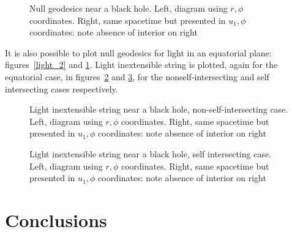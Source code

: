 \documentclass{article}
\begin{document}
\begin{figure}%
    \centering
    \caption{Null geodesics near a black hole.  Left, diagram using $r,\phi$
      coordinates.  Right, same spacetime but presented in $u_1,\phi$
      coordinates: note absence of interior on right}
    \label{light_closest_2}%
\end{figure}

It is also possible to plot null geodesics for light in an equatorial
plane: figures~\ref{light_2} and \ref{light_closest_2}.  Light
inextensible string is plotted, again for the equatorial case, in
figures~\ref{closest_approach_nonself} and
\ref{closest_approach_self}, for the nonself-intersecting and self
intersecting cases respectively.


\begin{figure}%
    \centering
    \caption{Light inextensible string near a black hole,
      non-self-intersecting case.  Left, diagram using $r,\phi$
      coordinates.  Right, same spacetime but presented in $u_1,\phi$
      coordinates: note absence of interior on right}
    \label{closest_approach_nonself}%
\end{figure}

\begin{figure}%
    \centering
    \caption{Light inextensible string near a black hole, self
      intersecting case.  Left, diagram using $r,\phi$ coordinates.
      Right, same spacetime but presented in $u_1,\phi$ coordinates:
      note absence of interior on right}
    \label{closest_approach_self}%
\end{figure}

\section{Conclusions}




  
\end{document}
